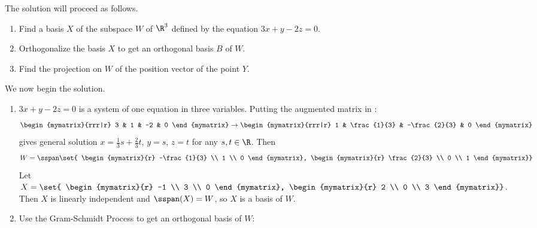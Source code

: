\begin{solution}
The solution will proceed as follows.
\begin{enumerate}
\item Find a basis $X$ of the subspace $W$ of $\R^3$ defined by
the equation  $3x+y-2z=0$.
\item Orthogonalize the basis $X$ to get an orthogonal basis
$B$ of $W$.
\item Find the projection on $W$ of the position vector of
the point $Y$.
\end{enumerate}

We now begin the solution.
\begin{enumerate}
\item $3x+y-2z=0$ is a system of one equation in three variables.
Putting the augmented matrix in {\rref}:
\[
\begin{mymatrix}{rrr|r} 3 & 1 & -2 & 0 \end{mymatrix}
\rightarrow
\begin{mymatrix}{rrr|r} 1 & \frac{1}{3} & -\frac{2}{3} & 0 \end{mymatrix}
\]
gives general solution $x=\frac{1}{3}s+\frac{2}{3}t$, $y=s$, $z=t$
for any $s,t\in\R$.
Then
\[
W=\sspan \set{
\begin{mymatrix}{r} -\frac{1}{3} \\ 1 \\ 0 \end{mymatrix},
\begin{mymatrix}{r} \frac{2}{3} \\ 0 \\ 1 \end{mymatrix}}
\]
Let
$X=\set{
\begin{mymatrix}{r} -1 \\ 3 \\ 0 \end{mymatrix},
\begin{mymatrix}{r} 2 \\ 0 \\ 3 \end{mymatrix}}$.
Then $X$ is linearly independent and $\sspan(X)=W$, so $X$ is a basis of $W$.

\item Use the Gram-Schmidt Process to get an
orthogonal basis of $W$:



\end{enumerate}
\end{solution}
